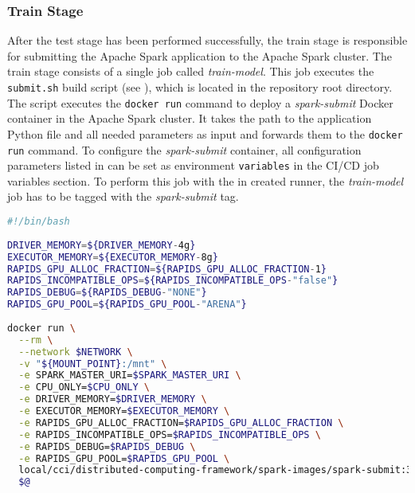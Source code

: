 \subsubsection{Train Stage}
After the test stage has been performed successfully, the train stage is responsible for submitting the Apache Spark application to the Apache Spark cluster.
The train stage consists of a single job called \textit{train-model}.
This job executes the \texttt{submit.sh} build script (see ), which is located in the repository root directory. The script executes the \texttt{docker run} command to deploy a \textit{spark-submit} Docker container in the Apache Spark cluster. It takes the path to the application Python file and all needed parameters as input and forwards them to the \texttt{docker run} command.
To configure the \textit{spark-submit} container, all configuration parameters listed in  can be set as environment \texttt{variables} in the CI/CD job variables section.
To perform this job with the in  created runner, the \textit{train-model} job has to be tagged with the \textit{spark-submit} tag.
%
\begin{lstlisting}[label=lst:06_ci_pipeline_submit, caption=Submit script to execute \texttt{docker run} with all needed configuration parameters, language=bash]
#!/bin/bash
 
DRIVER_MEMORY=${DRIVER_MEMORY-4g}
EXECUTOR_MEMORY=${EXECUTOR_MEMORY-8g}
RAPIDS_GPU_ALLOC_FRACTION=${RAPIDS_GPU_ALLOC_FRACTION-1}
RAPIDS_INCOMPATIBLE_OPS=${RAPIDS_INCOMPATIBLE_OPS-"false"}
RAPIDS_DEBUG=${RAPIDS_DEBUG-"NONE"}
RAPIDS_GPU_POOL=${RAPIDS_GPU_POOL-"ARENA"}
 
docker run \
  --rm \
  --network $NETWORK \
  -v "${MOUNT_POINT}:/mnt" \
  -e SPARK_MASTER_URI=$SPARK_MASTER_URI \
  -e CPU_ONLY=$CPU_ONLY \
  -e DRIVER_MEMORY=$DRIVER_MEMORY \
  -e EXECUTOR_MEMORY=$EXECUTOR_MEMORY \
  -e RAPIDS_GPU_ALLOC_FRACTION=$RAPIDS_GPU_ALLOC_FRACTION \
  -e RAPIDS_INCOMPATIBLE_OPS=$RAPIDS_INCOMPATIBLE_OPS \
  -e RAPIDS_DEBUG=$RAPIDS_DEBUG \
  -e RAPIDS_GPU_POOL=$RAPIDS_GPU_POOL \
  local/cci/distributed-computing-framework/spark-images/spark-submit:3.0.1-hadoop2.7 \
  $@
\end{lstlisting}


